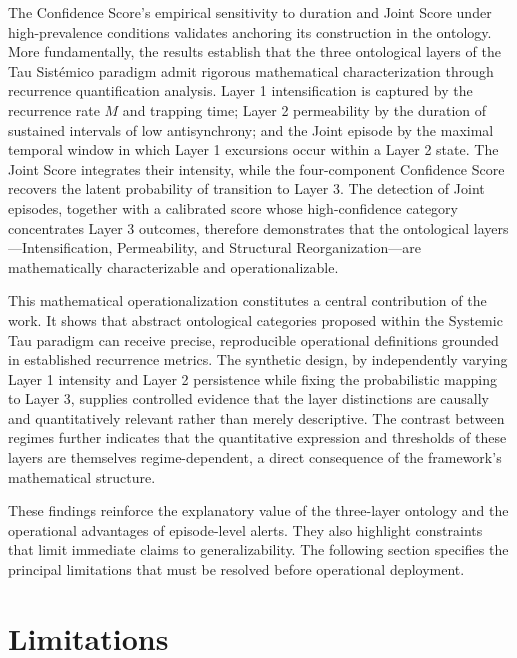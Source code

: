 \documentclass[11pt,a4paper]{article}
\begin{document}
The Confidence Score's empirical sensitivity to duration and Joint Score under high-prevalence conditions validates anchoring its construction in the ontology. More fundamentally, the results establish that the three ontological layers of the Tau Sistémico paradigm admit rigorous mathematical characterization through recurrence quantification analysis. Layer 1 intensification is captured by the recurrence rate $M$ and trapping time; Layer 2 permeability by the duration of sustained intervals of low antisynchrony; and the Joint episode by the maximal temporal window in which Layer 1 excursions occur within a Layer 2 state. The Joint Score integrates their intensity, while the four-component Confidence Score recovers the latent probability of transition to Layer 3. The detection of Joint episodes, together with a calibrated score whose high-confidence category concentrates Layer 3 outcomes, therefore demonstrates that the ontological layers---Intensification, Permeability, and Structural Reorganization---are mathematically characterizable and operationalizable.

This mathematical operationalization constitutes a central contribution of the work. It shows that abstract ontological categories proposed within the Systemic Tau paradigm can receive precise, reproducible operational definitions grounded in established recurrence metrics. The synthetic design, by independently varying Layer 1 intensity and Layer 2 persistence while fixing the probabilistic mapping to Layer 3, supplies controlled evidence that the layer distinctions are causally and quantitatively relevant rather than merely descriptive. The contrast between regimes further indicates that the quantitative expression and thresholds of these layers are themselves regime-dependent, a direct consequence of the framework's mathematical structure.

These findings reinforce the explanatory value of the three-layer ontology and the operational advantages of episode-level alerts. They also highlight constraints that limit immediate claims to generalizability. The following section specifies the principal limitations that must be resolved before operational deployment.

\section{Limitations}
\end{document}
